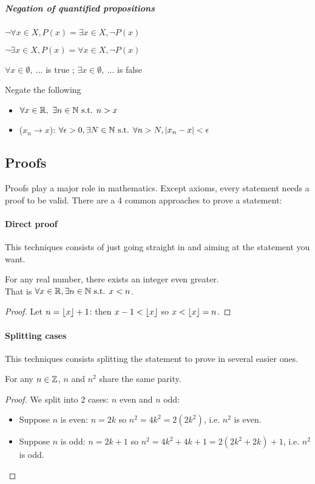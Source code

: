 \subparagraph{Negation of quantified propositions}
\begin{property}
    $\lnot \forall x\in X, P(x) = \exists x\in X, \lnot P(x)$
\end{property}
\begin{property}
    $\lnot \exists x\in X, P(x) = \forall x\in X, \lnot P(x)$
\end{property}
\begin{notation}
    $\forall x \in \emptyset, \ \dots$ is true ;
    $\exists x \in \emptyset, \ \dots$ is false
\end{notation}
\begin{question} Negate the following
    \begin{itemize}
        \item $\forall x \in \mathbb{R}, \ \exists n \in \mathbb{N} \text{ s.t. } n > x$
        \item ($x_n \to x$): $\forall \epsilon>0, \exists N \in \mathbb{N} \text{ s.t. } \forall n>N, | x_n-x |<\epsilon$
    \end{itemize}
\end{question}



\subsection{Proofs}
Proofs play a major role in mathematics.
Except axioms, every statement needs a proof to be valid.
There are a 4 common approaches to prove a statement:
\paragraph{Direct proof}
This techniques consists of just going straight in and aiming at the statement you want.
\begin{property}
    For any real number, there exists an integer even greater.\\
    That is $\forall x \in \mathbb{R}, \exists n \in \mathbb{N} \text{ s.t. } x<n$.
\end{property}
\begin{proof}
    Let $n = \lfloor x \rfloor+1$: then $x-1<\lfloor x \rfloor$ so $x<\lfloor x \rfloor=n$.
\end{proof}
\paragraph{Splitting cases}
This techniques consists splitting the statement to prove in several easier ones.
\begin{property}
    For any $n \in \mathbb{Z}$, $n$ and $n^2$ share the same parity.
\end{property}
\begin{proof} We split into 2 cases: $n$ even and $n$ odd:
    \begin{itemize}
        \item Suppose $n$ is even: $n=2k$ so $n^2=4k^2=2(2k^2)$, i.e. $n^2$ is even.
        \item Suppose $n$ is odd: $n=2k+1$ so $n^2=4k^2+4k+1=2(2k^2+2k)+1$, i.e. $n^2$ is odd.
    \end{itemize}
\end{proof}

